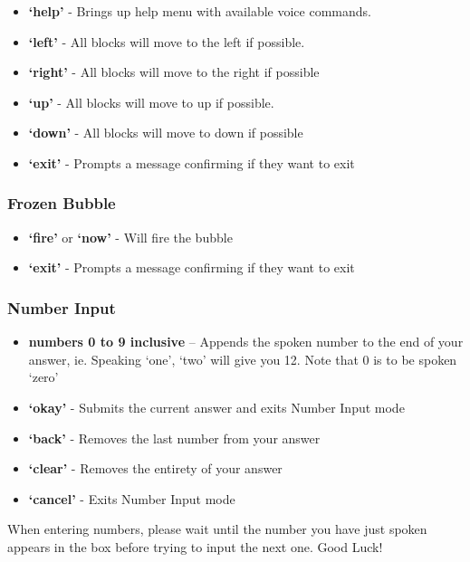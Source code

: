 \documentclass[11pt, oneside]{article}
\begin{document}
\begin{itemize}
  	\item {\bf`help'} - Brings up help menu with available voice commands. 
	\item {\bf`left'} - All blocks will move to the left if possible. 
	\item {\bf`right'} - All blocks will move to the right if possible
	\item {\bf`up'} - All blocks will move to up if possible. 
	\item {\bf`down'} - All blocks will move to down if possible
	\item {\bf`exit'} - Prompts a message confirming if they want to exit
	
\end{itemize}

\subsubsection{Frozen Bubble}

\begin{itemize}
	\item {\bf`fire'} or {\bf`now'} - Will fire the bubble
	\item {\bf`exit'} - Prompts a message confirming if they want to exit
	
\end{itemize}

\pagebreak

\subsubsection{Number Input}
\begin{itemize}
  \item {\bf numbers 0 to 9 inclusive} – Appends the spoken number
    to the end of your answer, ie. Speaking `one', `two' will give you
    12. Note that 0 is to be spoken `zero'
  \item {\bf `okay'} - Submits the current answer and exits Number
    Input mode
  \item {\bf `back'} - Removes the last number from your answer
  \item {\bf `clear'} - Removes the entirety of your answer
  \item {\bf `cancel'} - Exits Number Input mode
\end{itemize}

When entering numbers, please wait until the number you have just spoken appears
in the box before trying to input the next one.
Good Luck!
\end{document}
